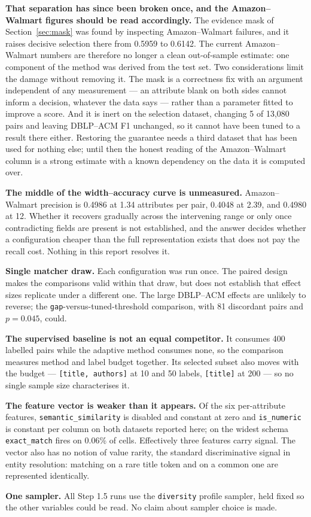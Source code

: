 \documentclass[11pt]{article}
\begin{document}
\textbf{That separation has since been broken once, and the Amazon--Walmart figures should
be read accordingly.} The evidence mask of Section~\ref{sec:mask} was found by inspecting
Amazon--Walmart failures, and it raises decisive selection there from 0.5959 to 0.6142. The
current Amazon--Walmart numbers are therefore no longer a clean out-of-sample estimate:
one component of the method was derived from the test set. Two considerations limit the
damage without removing it. The mask is a correctness fix with an argument independent of
any measurement --- an attribute blank on both sides cannot inform a decision, whatever the
data says --- rather than a parameter fitted to improve a score. And it is inert on the
selection dataset, changing 5 of 13{,}080 pairs and leaving DBLP--ACM F1 unchanged, so it
cannot have been tuned to a result there either. Restoring the guarantee needs a third
dataset that has been used for nothing else; until then the honest reading of the
Amazon--Walmart column is a strong estimate with a known dependency on the data it is
computed over.

\textbf{The middle of the width--accuracy curve is unmeasured.} Amazon--Walmart precision is
0.4986 at 1.34 attributes per pair, 0.4048 at 2.39, and 0.4980 at 12. Whether it recovers
gradually across the intervening range or only once contradicting fields are present is not
established, and the answer decides whether a configuration cheaper than the full
representation exists that does not pay the recall cost. Nothing in this report resolves it.

\textbf{Single matcher draw.} Each configuration was run once. The paired design makes the
comparisons valid within that draw, but does not establish that effect sizes replicate under
a different one. The large DBLP--ACM effects are unlikely to reverse; the
\texttt{gap}-versus-tuned-threshold comparison, with 81 discordant pairs and $p = 0.045$,
could.

\textbf{The supervised baseline is not an equal competitor.} It consumes 400 labelled pairs
while the adaptive method consumes none, so the comparison measures method and label budget
together. Its selected subset also moves with the budget --- \texttt{[title, authors]} at 10
and 50 labels, \texttt{[title]} at 200 --- so no single sample size characterises it.

\textbf{The feature vector is weaker than it appears.} Of the six per-attribute features,
\texttt{semantic\_similarity} is disabled and constant at zero and \texttt{is\_numeric} is
constant per column on both datasets reported here; on the widest schema
\texttt{exact\_match} fires on 0.06\% of cells. Effectively three features carry signal. The
vector also has no notion of value rarity, the standard discriminative signal in entity
resolution: matching on a rare title token and on a common one are represented identically.

\textbf{One sampler.} All Step 1.5 runs use the \texttt{diversity} profile sampler, held
fixed so the other variables could be read. No claim about sampler choice is made.
\end{document}
